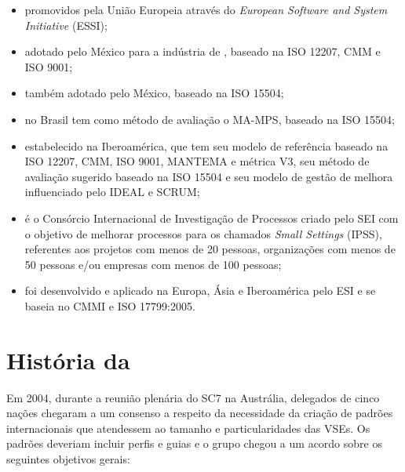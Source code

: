 \begin{itemize}

\item[\textbf{SPIRE\footnotemark e TOPS\footnotemark}] promovidos pela União Europeia através do \textit{European Software and System Initiative} (ESSI);

\item[\textbf{MoProSoft}] adotado pelo México para a indústria de \sw, baseado na ISO 12207, CMM e ISO 9001;

\item[\textbf{EvalProSoft}] também adotado pelo México, baseado na ISO 15504;

\item[\textbf{MPS-BR}] no Brasil tem como método de avaliação o MA-MPS, baseado na ISO 15504;

\item[\textbf{COMPETISOFT}] estabelecido na Iberoamérica, que tem seu modelo de referência baseado na ISO 12207, CMM, ISO 9001, MANTEMA  e métrica V3, seu método de avaliação sugerido baseado na ISO 15504 e seu modelo de gestão de melhora influenciado pelo IDEAL e SCRUM;

\item[\textbf{IPRC}] é o Consórcio Internacional de Investigação de Processos criado pelo SEI com o objetivo de melhorar processos para os chamados \textit{Small Settings} (IPSS), referentes aos projetos com menos de 20 pessoas, organizações com menos de 50 pessoas e/ou empresas com menos de 100 pessoas;

\item[\textbf{I.T.Mark}] foi desenvolvido e aplicado na Europa, Ásia e Iberoamérica pelo ESI e se baseia no CMMI e ISO 17799:2005.

\end{itemize}



\section{História da \iso}

Em 2004, durante a reunião plenária do SC7\footnotemark{} na Austrália, delegados de cinco nações chegaram a um consenso a respeito da necessidade da criação de padrões internacionais que atendessem ao tamanho e particularidades das VSEs. Os padrões deveriam incluir perfis e guias e o grupo chegou a um acordo sobre os seguintes objetivos gerais:

